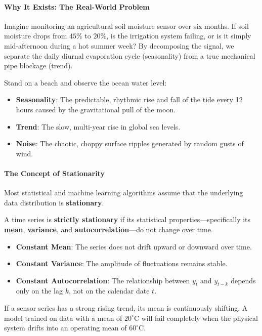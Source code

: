 \paragraph{Why It Exists: The Real-World Problem}
Imagine monitoring an agricultural soil moisture sensor over six months. If soil moisture drops from $45\%$ to $20\%$, is the irrigation system failing, or is it simply mid-afternoon during a hot summer week? By decomposing the signal, we separate the daily diurnal evaporation cycle (seasonality) from a true mechanical pipe blockage (trend).

\begin{analogy}
Stand on a beach and observe the ocean water level:
\begin{itemize}
    \item \textbf{Seasonality}: The predictable, rhythmic rise and fall of the tide every 12 hours caused by the gravitational pull of the moon.
    \item \textbf{Trend}: The slow, multi-year rise in global sea levels.
    \item \textbf{Noise}: The chaotic, choppy surface ripples generated by random gusts of wind.
\end{itemize}
\end{analogy}

\paragraph{The Concept of Stationarity}
Most statistical and machine learning algorithms assume that the underlying data distribution is \textbf{stationary}.
\begin{keyidea}[Stationarity]
A time series is \textbf{strictly stationary} if its statistical properties—specifically its \textbf{mean}, \textbf{variance}, and \textbf{autocorrelation}—do not change over time.
\begin{itemize}
    \item \textbf{Constant Mean}: The series does not drift upward or downward over time.
    \item \textbf{Constant Variance}: The amplitude of fluctuations remains stable.
    \item \textbf{Constant Autocorrelation}: The relationship between $y_t$ and $y_{t-k}$ depends only on the lag $k$, not on the calendar date $t$.
\end{itemize}
\end{keyidea}

If a sensor series has a strong rising trend, its mean is continuously shifting. A model trained on data with a mean of $20^\circ\text{C}$ will fail completely when the physical system drifts into an operating mean of $60^\circ\text{C}$.

